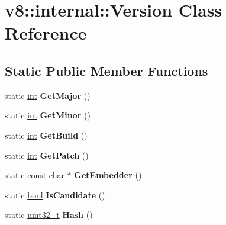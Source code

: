 \hypertarget{classv8_1_1internal_1_1Version}{}\section{v8\+:\+:internal\+:\+:Version Class Reference}
\label{classv8_1_1internal_1_1Version}
\subsection*{Static Public Member Functions}
\begin{DoxyCompactItemize}
\item 
\mbox{\label{classv8_1_1internal_1_1Version_a3d8a7322a94b24a794e232e39a810532}} 
static \mbox{\hyperlink{classint}{int}} {\bfseries Get\+Major} ()
\item 
\mbox{\label{classv8_1_1internal_1_1Version_a72873948c8d86b18bbf1059481259af8}} 
static \mbox{\hyperlink{classint}{int}} {\bfseries Get\+Minor} ()
\item 
\mbox{\label{classv8_1_1internal_1_1Version_a5fc1a8f4abe00d63ce6b1de28aa10623}} 
static \mbox{\hyperlink{classint}{int}} {\bfseries Get\+Build} ()
\item 
\mbox{\label{classv8_1_1internal_1_1Version_a60b6f29b460ab319280241a1b6273330}} 
static \mbox{\hyperlink{classint}{int}} {\bfseries Get\+Patch} ()
\item 
\mbox{\label{classv8_1_1internal_1_1Version_a8635ba928dd0113eb92635fb1b78ab00}} 
static const \mbox{\hyperlink{classchar}{char}} $\ast$ {\bfseries Get\+Embedder} ()
\item 
\mbox{\label{classv8_1_1internal_1_1Version_ae62c0c059d688ed1b252311d319b56dd}} 
static \mbox{\hyperlink{classbool}{bool}} {\bfseries Is\+Candidate} ()
\item 
\mbox{\label{classv8_1_1internal_1_1Version_ae10e2f0dadfb79d26242991536069390}} 
static \mbox{\hyperlink{classuint32__t}{uint32\+\_\+t}} {\bfseries Hash} ()
\item 

\end{DoxyCompactItemize}
